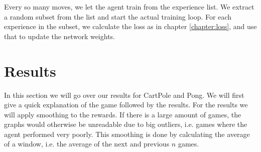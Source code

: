 \documentclass{article}
\begin{document}
Every so many moves, we let the agent train from the experience list. We extract a random subset from the list and start the actual training loop. For each experience in the subset, we calculate the loss as in chapter \ref{chapter:loss}, and use that to update the network weights.







%




\section{Results}
In this section we will go over our results for CartPole and Pong. We will first give a quick explanation of the game followed by the results. For the results we will apply smoothing to the rewards. If there is a large amount of games, the graphs would otherwise be unreadable due to big outliers, i.e. games where the agent performed very poorly. This smoothing is done by calculating the average of a window, i.e. the average of the next and previous $n$ games.
\end{document}
